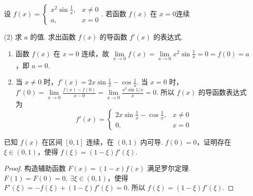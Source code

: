 \begin{problem}[本题8分]
  设 $f(x) =
  \begin{cases}
    x^2 \sin\frac1x, & x \neq 0\\
    a,               & x = 0
  \end{cases}$. 若函数 $f(x)$ 在 $x = 0$连续
  \begin{tasks}[ label = \arabic*. ](2)
    \task 求 $a$ 的值.
    \task 求出函数 $f(x)$ 的导函数 $f'(x)$ 的表达式.
  \end{tasks}
\end{problem}
\scratch
\begin{solution}\leavevmode
  \begin{enumerate}
    \item 函数 $f(x)$ 在 $x = 0$ 连续，故
    $ \lim\limits_{x \to 0} f(x)
    = \lim\limits_{x \to 0} x^2 \sin\frac1x = 0 = f(0) = a$，即 $a = 0$.
    \item 当 $x \neq 0$ 时，$f'(x) = 2x \sin\frac1x - \cos\frac1x$.
    当 $x = 0$ 时，$ f'(0) = \lim\limits_{x \to 0} \frac{f(x) - f(0)}{x - 0}
                          = \lim\limits_{x \to 0} \frac{x^2 \sin1/x}{x} = 0$.
    所以 $f(x)$ 的导函数表达式为
    \[
      f'(x) =
      \begin{cases}
        2x \sin\frac1x - \cos\frac1x, & x \neq 0\\
        0,                            & x = 0
      \end{cases}
    \]
  \end{enumerate}
\end{solution}

\begin{problem}
  已知 $f(x)$ 在区间 $[0,1]$ 连续，在 $(0,1)$ 内可导.
  $f(0) = 0$，证明存在 $\xi \in (0,1)$，使得 $f(\xi) = (1 - \xi)f'(\xi)$.
\end{problem}
\scratch
\begin{solution}
  \begin{proof}
    构造辅助函数 $F(x) = (1 - x)f(x)$ 满足罗尔定理.
    $F(1) = F(0) = 0,~ \exists \xi \in (0,1)$，使得
    $F'(\xi) = -f(\xi) + (1 - \xi)f'(\xi) = 0$. 所以
    $f(\xi) = (1 - \xi)f'(\xi)$.
  \end{proof}
\end{solution}